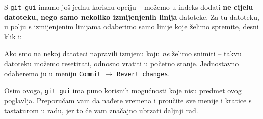 S \verb+git gui+ imamo još jednu korisnu opciju -- možemo u indeks dodati \textbf{ne cijelu datoteku, nego samo nekoliko izmijenjenih linija} datoteke.
Za tu datoteku, u polju s izmijenjenim linijama odaberimo samo linije koje želimo spremite, desni klik i:


Ako smo na nekoj datoteci napravili izmjenu koju \emph{ne} želimo snimiti -- takvu datoteku možemo resetirati, odnosno vratiti u početno stanje. 
Jednostavno odaberemo ju u meniju \verb+Commit+ $\rightarrow$ \verb+Revert changes+.

Osim ovoga, \verb+git gui+ ima puno korisnih mogućnosti koje nisu predmet ovog poglavlja.
Preporučam vam da nađete vremena i proučite sve menije i kratice s tastaturom u radu, jer to će vam značajno ubrzati daljnji rad.



